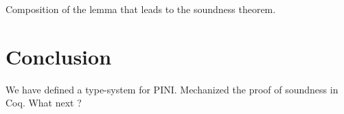 \documentclass[10pt]{article}
\begin{document}
Composition of the lemma that leads to the soundness theorem.

\section{Conclusion}%
\label{sec:conclusion}

We have defined a type-system for PINI. Mechanized the proof of soundness in Coq.
What next ?




\end{document}
